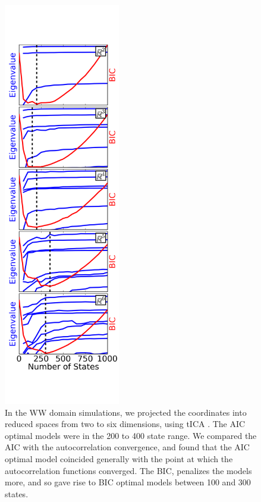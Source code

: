 \documentclass[twocolumn,floatfix,nofootinbib,aps]{revtex4-1}
\begin{document}
\begin{figure}
\centering
\includegraphics[width=2in]{figs/ww_bic_vs_eval.png}
\caption{In the WW domain simulations, we projected the coordinates into reduced spaces from two to six dimensions, using tICA \cite{Schwantes:2013..}. The AIC optimal models were in the 200 to 400 state range. We compared the AIC with the autocorrelation convergence, and found that the AIC optimal model coincided generally with the point at which the autocorrelation functions converged. The BIC, penalizes the models more, and so gave rise to BIC optimal models between 100 and 300 states.}
\end{figure}


\end{document}
